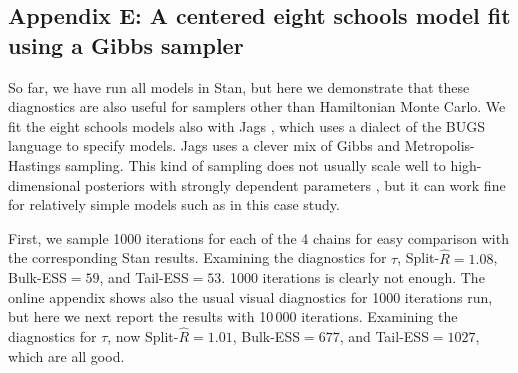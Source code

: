 \documentclass[american,]{article}
\theoremstyle{definition}
\begin{document}
\hypertarget{eight-schools-with-jags}{%
\subsection*{Appendix E: A centered eight schools model fit using a Gibbs sampler}\label{eight-schools-with-jags}}

So far, we have run all models in Stan, but here we demonstrate that
these diagnostics are  also useful for samplers other than 
Hamiltonian Monte Carlo.  We fit the eight schools models also with
 Jags \citep{plummer2003jags}, which uses a dialect of the BUGS
language \citep{lunn2009bugs} to specify models. Jags uses a clever
mix of Gibbs and Metropolis-Hastings sampling. This kind of sampling
does not usually scale well to high-dimensional posteriors with strongly
dependent parameters \citep[see, e.g.][]{Hoffman+Gelman:2014}, but it can work fine for relatively simple models such as in this case study.


First, we sample 1000 iterations for each of the 4 chains for easy
comparison with the corresponding Stan results. Examining the
diagnostics for $\tau$, Split-\(\widehat{R}=1.08\), Bulk-ESS$=59$, and
Tail-ESS$=53$. 1000 iterations is clearly not enough. The online
appendix shows also the usual visual diagnostics for 1000 iterations
run, but here we next report the results with 10\,000 iterations.
Examining the diagnostics for $\tau$, now Split-\(\widehat{R}=1.01\),
Bulk-ESS$=677$, and Tail-ESS$=1027$, which are all good.
\end{document}
